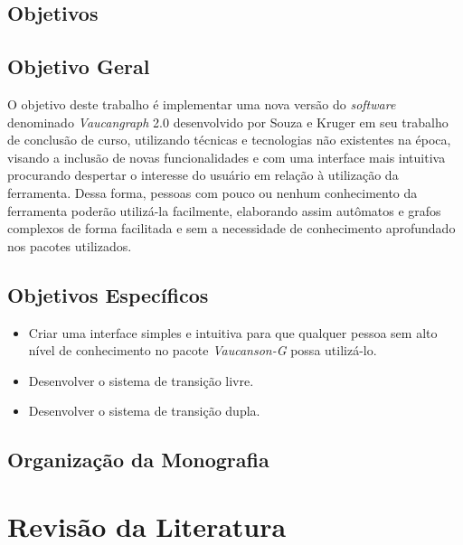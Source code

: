\documentclass[a4paper,12pt,portuguese]{ufms-cpcx}
\begin{document}
 \section{Objetivos}
 
 
 \section{Objetivo Geral}
  
  
 O objetivo deste trabalho é implementar uma nova versão do \textit {software} denominado \textit{Vaucangraph} 2.0 desenvolvido por Souza e Kruger \cite{Souza e Kruger(2010)} em seu trabalho de conclusão de curso, utilizando técnicas e tecnologias não existentes na época, visando a inclusão de novas funcionalidades e com uma interface mais intuitiva procurando despertar o interesse do usuário em relação à utilização da ferramenta. Dessa forma, pessoas com pouco ou nenhum conhecimento da ferramenta poderão utilizá-la facilmente, elaborando assim autômatos e grafos  complexos de forma facilitada e sem a necessidade de conhecimento aprofundado nos pacotes utilizados.
 

\section{Objetivos Específicos}

\begin{itemize}
	
	
	\item Criar uma interface simples e intuitiva para que qualquer pessoa sem alto nível de conhecimento no pacote \textit{Vaucanson-G} possa utilizá-lo.
	
	\item Desenvolver o sistema de transição livre.
	
	\item Desenvolver o sistema de transição dupla.
	
	
\end{itemize}

\section {Organização da Monografia}



\chapter{Revisão da Literatura}
\end{document}
